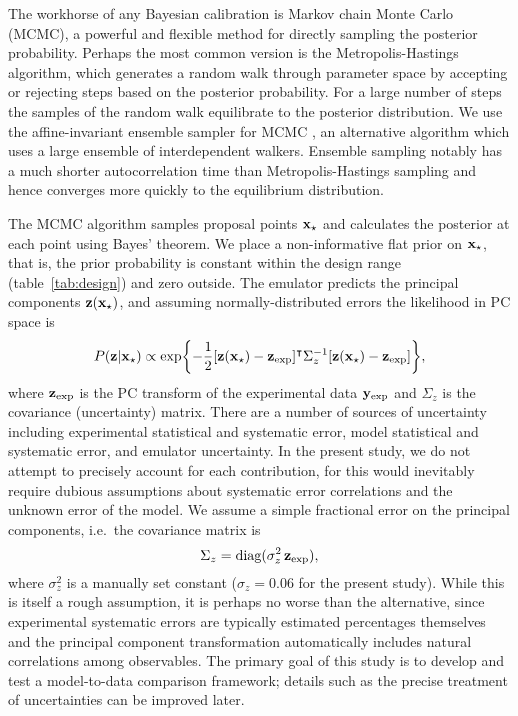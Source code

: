 \documentclass[aps,prc,reprint,superscriptaddress,amsmath]{revtex4-1}
\newcommand{\tran}{^\intercal}
\begin{document}
The workhorse of any Bayesian calibration is Markov chain Monte Carlo (MCMC), a powerful and flexible method for directly sampling the posterior probability.
Perhaps the most common version is the Metropolis-Hastings algorithm, which generates a random walk through parameter space by accepting or rejecting steps based on the posterior probability.
For a large number of steps the samples of the random walk equilibrate to the posterior distribution.
We use the affine-invariant ensemble sampler for MCMC \cite{Goodman:2010en,FM:2013mc}, an alternative algorithm which uses a large ensemble of interdependent walkers.
Ensemble sampling notably has a much shorter autocorrelation time than Metropolis-Hastings sampling and hence converges  more quickly to the equilibrium distribution. 

The MCMC algorithm samples proposal points $\mathbf x_\star$ and calculates the posterior at each point using Bayes' theorem.
We place a non-informative flat prior on $\mathbf x_\star$, that is, the prior probability is constant within the design range (table~\ref{tab:design}) and zero outside.
The emulator predicts the principal components $\mathbf z(\mathbf x_\star)$, and assuming normally-distributed errors the likelihood in PC space is
\begin{equation}
  P(\z|\xs) \propto \exp\biggl\{ -\frac{1}{2} [\z(\xs) - \zexp]\tran \Sigma_z^{-1} [\z(\xs) - \zexp] \biggr\},
  \label{eq:likelihood}
\end{equation}
where $\mathbf z_\text{exp}$ is the PC transform of the experimental data $\mathbf y_\text{exp}$ and $\Sigma_z$ is the covariance (uncertainty) matrix.
There are a number of sources of uncertainty including experimental statistical and systematic error, model statistical and systematic error, and emulator uncertainty.
In the present study, we do not attempt to precisely account for each contribution, for this would inevitably require dubious assumptions about systematic error correlations and the unknown error of the model.
We assume a simple fractional error on the principal components, i.e.\ the covariance matrix is
\begin{equation}
  \Sigma_z = \text{diag}(\sigma^2_z\,\mathbf z_\text{exp}),
\end{equation}
where $\sigma^2_z$ is a manually set constant ($\sigma_z = 0.06$ for the present study).
While this is itself a rough assumption, it is perhaps no worse than the alternative, since experimental systematic errors are typically estimated percentages themselves and the principal component transformation automatically includes natural correlations among observables.
The primary goal of this study is to develop and test a model-to-data comparison framework; details such as the precise treatment of uncertainties can be improved later.
\end{document}
